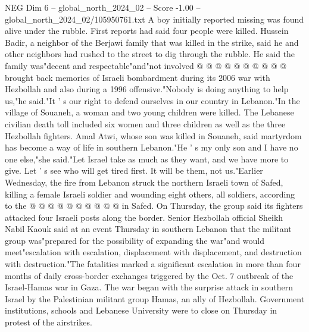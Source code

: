 \begin{textsample}{NEG Dim 6 – global\_north\_2024\_02 – Score -1.00 – global\_north\_2024\_02/105950761.txt}
A boy initially reported missing was found alive under the rubble.
First reports had said four people were killed.
Hussein Badir, a neighbor of the Berjawi family that was killed in the strike, said he and other neighbors had rushed to the street to dig through the rubble.
He said the family was"decent and respectable"and"not involved @ @ @ @ @ @ @ @ @ @ brought back memories of Israeli bombardment during its 2006 war with Hezbollah and also during a 1996 offensive."Nobody is doing anything to help us,"he said."It ' s our right to defend ourselves in our country in Lebanon."In the village of Souaneh, a woman and two young children were killed.
The Lebanese civilian death toll included six women and three children as well as the three Hezbollah fighters.
Amal Atwi, whose son was killed in Souaneh, said martyrdom has become a way of life in southern Lebanon."He ' s my only son and I have no one else,"she said."Let Israel take as much as they want, and we have more to give.
Let ' s see who will get tired first.
It will be them, not us."Earlier Wednesday, the fire from Lebanon struck the northern Israeli town of Safed, killing a female Israeli soldier and wounding eight others, all soldiers, according to the @ @ @ @ @ @ @ @ @ @ in Safed.
On Thursday, the group said its fighters attacked four Israeli posts along the border.
Senior Hezbollah official Sheikh Nabil Kaouk said at an event Thursday in southern Lebanon that the militant group was"prepared for the possibility of expanding the war"and would meet"escalation with escalation, displacement with displacement, and destruction with destruction."The fatalities marked a significant escalation in more than four months of daily cross-border exchanges triggered by the Oct. 7 outbreak of the Israel-Hamas war in Gaza.
The war began with the surprise attack in southern Israel by the Palestinian militant group Hamas, an ally of Hezbollah.
Government institutions, schools and Lebanese University were to close on Thursday in protest of the airstrikes.

\end{textsample}
